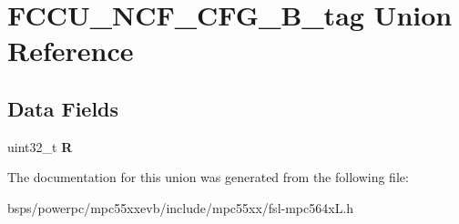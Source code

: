 \hypertarget{unionFCCU__NCF__CFG__32B__tag}{}\section{F\+C\+C\+U\+\_\+\+N\+C\+F\+\_\+\+C\+F\+G\+\_\+B\+\_\+tag Union Reference}
\label{unionFCCU__NCF__CFG__32B__tag}
\subsection*{Data Fields}
\begin{DoxyCompactItemize}
\item 
\mbox{\label{unionFCCU__NCF__CFG__32B__tag_ad9582fe8b8d7b8323e0454843fe4fe94}} 
uint32\+\_\+t {\bfseries R}
\end{DoxyCompactItemize}


The documentation for this union was generated from the following file\+:\begin{DoxyCompactItemize}
\item 
bsps/powerpc/mpc55xxevb/include/mpc55xx/fsl-\/mpc564x\+L.\+h\end{DoxyCompactItemize}
